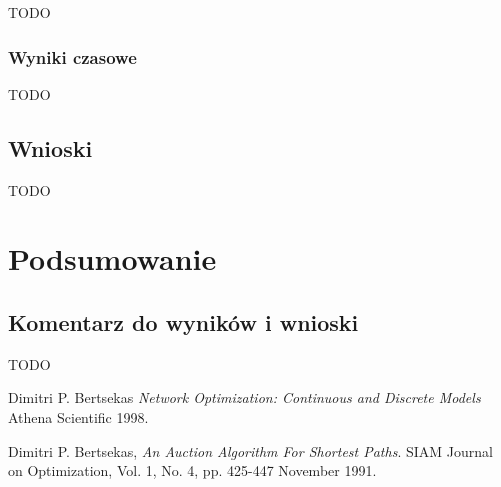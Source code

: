 \documentclass {report}
\begin{document}
TODO

\subsection{Wyniki czasowe}

TODO

\section{Wnioski}

TODO

\chapter{Podsumowanie}

\section{Komentarz do wyników i wnioski}

TODO

\begin{thebibliography}{9}

        Dimitri P. Bertsekas
        \emph{Network Optimization: Continuous and Discrete Models}
        Athena Scientific
        1998.

        Dimitri P. Bertsekas,
        \emph{An Auction Algorithm For Shortest Paths}.
        SIAM Journal on Optimization,
        Vol. 1, No. 4, pp. 425-447
        November 1991.
      
\end{thebibliography}
\end{document}
